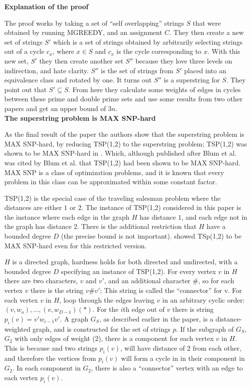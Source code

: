 \documentclass[letterpaper,11pt,titlepage]{article}
\begin{document}
\textbf{Explanation of the proof}

The proof works by taking a set of ``self overlapping'' strings $S$ that were obtained by running MGREEDY, and an assignment $C$. They then create a new set of strings $S'$ which is a set of strings obtained by arbitrarily selecting strings out of a cycle $c_x$, where $x \in S$ and $c_x$ is the cycle corresponding to $x$. With this new set, $S'$ they then create another set $S''$ because they love three levels on indirection, and hate clarity. $S''$ is the set of strings from $S'$ placed into an equivalence class and rotated by one. It turns out $S''$ is a superstring for $S$. They point out that $S' \subseteq S$. From here they calculate some weights of edges in cycles between these prime and double prime sets and use some results from two other papers and get an upper bound of $3n$.\\


\textbf{The superstring problem is MAX SNP-hard}

As the final result of the paper the authors show that the superstring problem is MAX SNP-hard, by reducing TSP(1,2) to the superstring problem; TSP(1,2) was shown to be MAX SNP-hard in \cite{papadimitriou1993}.  Which, although published after Blum et al. was cited by Blum et al. that TSP(1,2) had been shown to be MAX SNP-hard.  MAX SNP is a class of optimization problems, and it is known that every problem in this class can be approximated within some constant factor. 

TSP(1,2) is the special case of the traveling salesman problem where the distances are either $1$ or $2$.  The instance of TSP(1,2) considered in this paper is the instance where each edge in the graph $H$ has distance $1$, and each edge not in the graph has distance $2$.  There is the additional restriction that $H$ have a bounded degree $D$ (the precise bound is not important).  \cite{papadimitriou1993} showed TSp(1,2) to be MAX SNP-hard even for this restricted version.  


$H$ is a directed graph, hardness holds for both directed and undirected, with a bounded degree $D$ specifying an instance of TSP(1,2).  For every vertex $v$ in $H$ there are two characters, $v$ and $v'$, and an additional character $\#$, so for each vertex $v$ there is the string $v\#v'$; This string is called the ``connector'' for v.  For each vertex $v$ in $H$, loop through the edges leaving $v$ in an arbitrary cyclic order: $(v, w_o),...,(v,w_{D-1})(*)$.  For the $i$th edge out of $v$ there is string $p_i(v) = v'w_{i-1}v'$.  A graph $G_S$, as described earlier in the paper, is a distance-weighted graph, and is constructed for the set of strings $p$.  If the subgraph of $G_S$, $G_2$ with only edges of weight (2), there is a component for each vertex $v$ in $H$.  This is because and two strings $p_i(v)$, will have distance of $2$ from each other, and therefore the vertices from $p_i(v)$ will form a cycle in in their component in $G_2$.  In each component in $G_2$, there is also a ``connector'' vertex with an edge to each vertex $p_i(v)$.  
\end{document}
